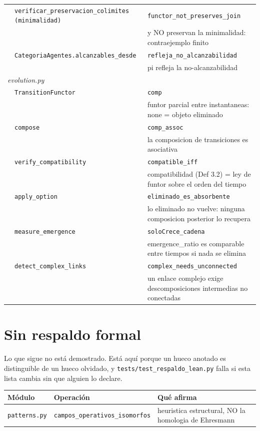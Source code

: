 \documentclass[11pt,a4paper]{article}
\begin{document}
\begin{longtable}{@{}p{1.2cm}p{5.9cm}p{7.2cm}@{}}
  & \texttt{verificar\_preservacion\_colimites (minimalidad)} & \texttt{functor\_not\_preserves\_join} \\
  &  & \footnotesize y NO preservan la minimalidad: contraejemplo finito \\
  & \texttt{CategoriaAgentes.alcanzables\_desde} & \texttt{refleja\_no\_alcanzabilidad} \\
  &  & \footnotesize pi refleja la no-alcanzabilidad \\
\midrule \multicolumn{3}{l}{\textit{evolution.py}} \\
  & \texttt{TransitionFunctor} & \texttt{comp} \\
  &  & \footnotesize funtor parcial entre instantaneas: none = objeto eliminado \\
  & \texttt{compose} & \texttt{comp\_assoc} \\
  &  & \footnotesize la composicion de transiciones es asociativa \\
  & \texttt{verify\_compatibility} & \texttt{compatible\_iff} \\
  &  & \footnotesize compatibilidad (Def 3.2) = ley de funtor sobre el orden del tiempo \\
  & \texttt{apply\_option} & \texttt{eliminado\_es\_absorbente} \\
  &  & \footnotesize lo eliminado no vuelve: ninguna composicion posterior lo recupera \\
  & \texttt{measure\_emergence} & \texttt{soloCrece\_cadena} \\
  &  & \footnotesize emergence\_ratio es comparable entre tiempos si nada se elimina \\
  & \texttt{detect\_complex\_links} & \texttt{complex\_needs\_unconnected} \\
  &  & \footnotesize un enlace complejo exige descomposiciones intermedias no conectadas \\
\bottomrule
\end{longtable}

\section{Sin respaldo formal}

Lo que sigue no está demostrado. Está aquí porque un hueco anotado es
distinguible de un hueco olvidado, y \texttt{tests/test\_respaldo\_lean.py}
falla si esta lista cambia sin que alguien lo declare.

\begin{center}
\begin{tabular}{@{}p{2.4cm}p{4.2cm}p{7.5cm}@{}}
\toprule
Módulo & Operación & Qué afirma \\
\midrule
\texttt{patterns.py} & \texttt{campos\_operativos\_isomorfos} & \footnotesize heuristica estructural, NO la homologia de Ehresmann \\
\bottomrule
\end{tabular}
\end{center}
\end{document}
